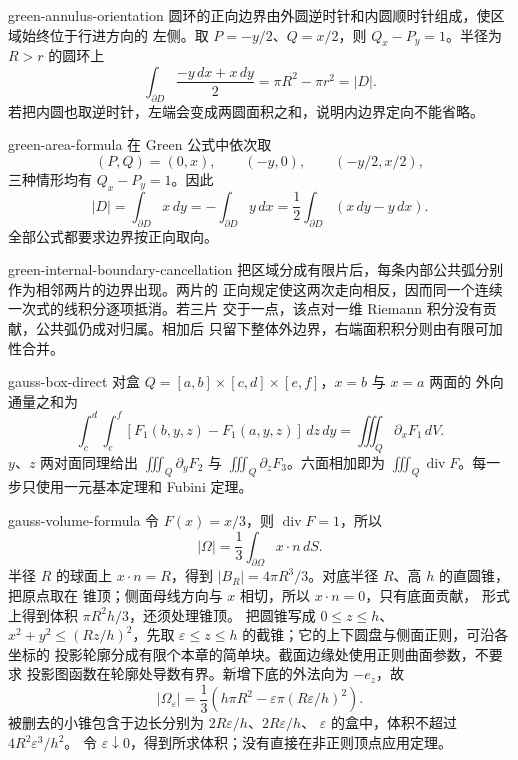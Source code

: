 \begin{solution}{green-annulus-orientation}
圆环的正向边界由外圆逆时针和内圆顺时针组成，使区域始终位于行进方向的
左侧。取 \(P=-y/2\)、\(Q=x/2\)，则 \(Q_x-P_y=1\)。半径为 \(R>r\)
的圆环上
\[
 \int_{\partial D}\frac{-y\,dx+x\,dy}{2}
 =\pi R^2-\pi r^2=|D|.
\]
若把内圆也取逆时针，左端会变成两圆面积之和，说明内边界定向不能省略。
\end{solution}

\begin{solution}{green-area-formula}
在 Green 公式中依次取
\[
 (P,Q)=(0,x),\qquad(-y,0),\qquad(-y/2,x/2),
\]
三种情形均有 \(Q_x-P_y=1\)。因此
\[
 |D|=\int_{\partial D}x\,dy
 =-\int_{\partial D}y\,dx
 =\frac12\int_{\partial D}(x\,dy-y\,dx).
\]
全部公式都要求边界按正向取向。
\end{solution}

\begin{solution}{green-internal-boundary-cancellation}
把区域分成有限片后，每条内部公共弧分别作为相邻两片的边界出现。两片的
正向规定使这两次走向相反，因而同一个连续一次式的线积分逐项抵消。若三片
交于一点，该点对一维 Riemann 积分没有贡献，公共弧仍成对归属。相加后
只留下整体外边界，右端面积积分则由有限可加性合并。
\end{solution}

\begin{solution}{gauss-box-direct}
对盒 \(Q=[a,b]\times[c,d]\times[e,f]\)，\(x=b\) 与 \(x=a\) 两面的
外向通量之和为
\[
 \int_c^d\int_e^f
 [F_1(b,y,z)-F_1(a,y,z)]\,dz\,dy
 =\iiint_Q\partial_xF_1\,dV.
\]
\(y\)、\(z\) 两对面同理给出
\(\iiint_Q\partial_yF_2\) 与 \(\iiint_Q\partial_zF_3\)。六面相加即为
\(\iiint_Q\operatorname{div}F\)。每一步只使用一元基本定理和 Fubini
定理。
\end{solution}

\begin{solution}{gauss-volume-formula}
令 \(F(x)=x/3\)，则 \(\operatorname{div}F=1\)，所以
\[
 |\Omega|=\frac13\int_{\partial\Omega}x\cdot n\,dS.
\]
半径 \(R\) 的球面上 \(x\cdot n=R\)，得到
\(|B_R|=4\pi R^3/3\)。对底半径 \(R\)、高 \(h\) 的直圆锥，把原点取在
锥顶；侧面母线方向与 \(x\) 相切，所以 \(x\cdot n=0\)，只有底面贡献，
形式上得到体积 \(\pi R^2h/3\)，还须处理锥顶。
把圆锥写成 $0\le z\le h$、$x^2+y^2\le (Rz/h)^2$，先取
$\varepsilon\le z\le h$ 的截锥；它的上下圆盘与侧面正则，可沿各坐标的
投影轮廓分成有限个本章的简单块。截面边缘处使用正则曲面参数，不要求
投影图函数在轮廓处导数有界。新增下底的外法向为 $-e_z$，故
\[
 |\Omega_\varepsilon|
 =\frac13\left(h\pi R^2
             -\varepsilon\pi(R\varepsilon/h)^2\right).
\]
被删去的小锥包含于边长分别为 $2R\varepsilon/h$、$2R\varepsilon/h$、
$\varepsilon$ 的盒中，体积不超过 $4R^2\varepsilon^3/h^2$。
令 $\varepsilon\downarrow0$，得到所求体积；没有直接在非正则顶点应用定理。
\end{solution}

